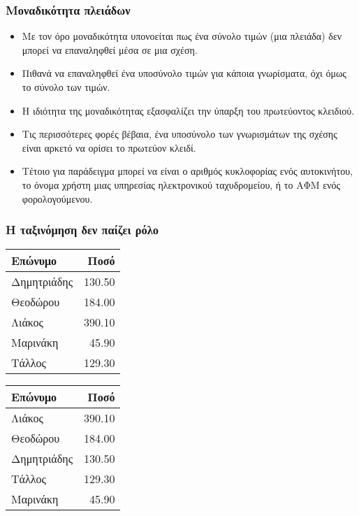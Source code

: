 \begin{frame}
\frametitle{Μοναδικότητα πλειάδων}
\begin{minipage}{\wE}
\pause
\begin{itemize} [<+->] \itemsep 4pt
  \item Με τον όρο μοναδικότητα υπονοείται πως ένα σύνολο τιμών (μια πλειάδα) 
        δεν μπορεί να επαναληφθεί μέσα σε μια σχέση.
  \item Πιθανά να επαναληφθεί ένα υποσύνολο τιμών για κάποια γνωρίσματα, όχι όμως
        το σύνολο των τιμών.
  \item Η ιδιότητα της μοναδικότητας εξασφαλίζει την ύπαρξη του {\crr πρωτεύοντος κλειδιού}.
  \item Τις περισσότερες φορές βέβαια, ένα υποσύνολο των γνωρισμάτων της σχέσης
        είναι αρκετό να ορίσει το πρωτεύον κλειδί.
  \item Τέτοιο για παράδειγμα μπορεί να είναι ο αριθμός κυκλοφορίας ενός αυτοκινήτου,
        το όνομα χρήστη μιας υπηρεσίας ηλεκτρονικού ταχυδρομείου,
        ή το ΑΦΜ ενός φορολογούμενου.
\end{itemize}
\end{minipage}
\end{frame}



\begin{frame}
\frametitle{Η ταξινόμηση δεν παίζει ρόλο}
\begin{tabular}{ l r } \hline 
  {\bf Επώνυμο} & {\bf Ποσό} \\ \hline 
  Δημητριάδης & 130.50 \\ 
  Θεοδώρου    & 184.00   \\
  Λιάκος      & 390.10 \\ 
  Μαρινάκη    & 45.90 \\ 
  Τάλλος      & 129.30   \\  \hline
\end{tabular}
\hspace*{1cm}
\begin{tabular}{ l r } \hline 
  {\bf Επώνυμο} & {\bf Ποσό} \\ \hline 
  Λιάκος      & 390.10 \\ 
  Θεοδώρου    & 184.00 \\ 
  Δημητριάδης & 130.50 \\ 
  Τάλλος      & 129.30 \\ 
  Μαρινάκη    & 45.90  \\  \hline 
\end{tabular}
\end{frame}


